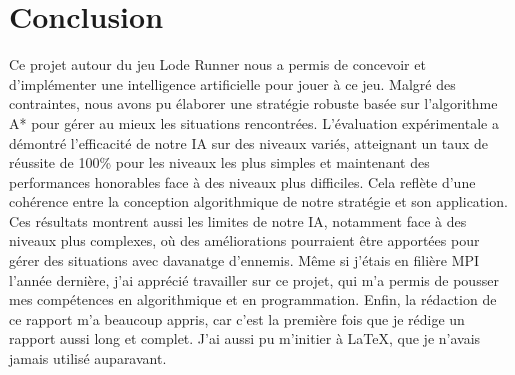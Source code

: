 \chapter{Conclusion}
\label{cp:conclusion}

Ce projet autour du jeu Lode Runner nous a permis de concevoir et d'implémenter une intelligence artificielle pour jouer à ce jeu.
Malgré des contraintes, nous avons pu élaborer une stratégie robuste basée sur l'algorithme A* pour gérer au mieux les situations rencontrées.
\newline
L'évaluation expérimentale a démontré l'efficacité de notre IA sur des niveaux variés, atteignant un taux de réussite de 100\% pour les niveaux les plus simples et maintenant des performances honorables face à des niveaux plus difficiles.
Cela reflète d'une cohérence entre la conception algorithmique de notre stratégie et son application.
\newline
Ces résultats montrent aussi les limites de notre IA, notamment face à des niveaux plus complexes, où des améliorations pourraient être apportées pour gérer des situations avec davanatge d'ennemis.
\newline\newline
Même si j'étais en filière MPI l'année dernière, j'ai apprécié travailler sur ce projet, qui m'a permis de pousser mes compétences en algorithmique et en programmation.
\newline
Enfin, la rédaction de ce rapport m'a beaucoup appris, car c'est la première fois que je rédige un rapport aussi long et complet.
J'ai aussi pu m'initier à \LaTeX, que je n'avais jamais utilisé auparavant.
